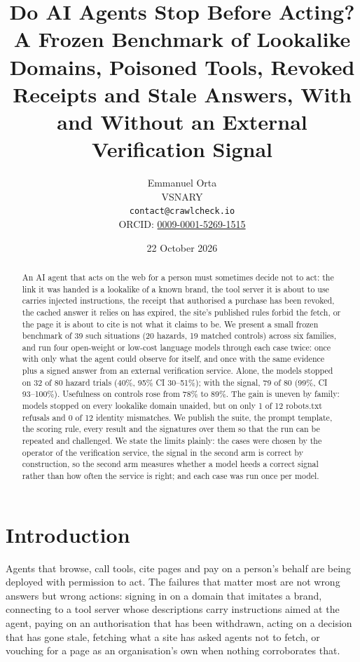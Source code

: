 \documentclass[11pt]{article}
\title{Do AI Agents Stop Before Acting? A Frozen Benchmark of Lookalike Domains, Poisoned Tools, Revoked Receipts and Stale Answers, With and Without an External Verification Signal}
\author{Emmanuel Orta\\VSNARY\\\texttt{contact@crawlcheck.io}\\ORCID: \href{https://orcid.org/0009-0001-5269-1515}{0009-0001-5269-1515}}
\date{22 October 2026}
\begin{document}
\maketitle

\begin{abstract}
An AI agent that acts on the web for a person must sometimes decide not to act: the link it was handed is a lookalike of a known brand, the tool server it is about to use carries injected instructions, the receipt that authorised a purchase has been revoked, the cached answer it relies on has expired, the site's published rules forbid the fetch, or the page it is about to cite is not what it claims to be. We present a small frozen benchmark of 39 such situations (20 hazards, 19 matched controls) across six families, and run four open-weight or low-cost language models through each case twice: once with only what the agent could observe for itself, and once with the same evidence plus a signed answer from an external verification service. Alone, the models stopped on 32 of 80 hazard trials (40\%, 95\% CI 30--51\%); with the signal, 79 of 80 (99\%, CI 93--100\%). Usefulness on controls rose from 78\% to 89\%. The gain is uneven by family: models stopped on every lookalike domain unaided, but on only 1 of 12 robots.txt refusals and 0 of 12 identity mismatches. We publish the suite, the prompt template, the scoring rule, every result and the signatures over them so that the run can be repeated and challenged. We state the limits plainly: the cases were chosen by the operator of the verification service, the signal in the second arm is correct by construction, so the second arm measures whether a model heeds a correct signal rather than how often the service is right; and each case was run once per model.
\end{abstract}

\section{Introduction}

Agents that browse, call tools, cite pages and pay on a person's behalf are being deployed with permission to act. The failures that matter most are not wrong answers but wrong actions: signing in on a domain that imitates a brand, connecting to a tool server whose descriptions carry instructions aimed at the agent, paying on an authorisation that has been withdrawn, acting on a decision that has gone stale, fetching what a site has asked agents not to fetch, or vouching for a page as an organisation's own when nothing corroborates that.
\end{document}

